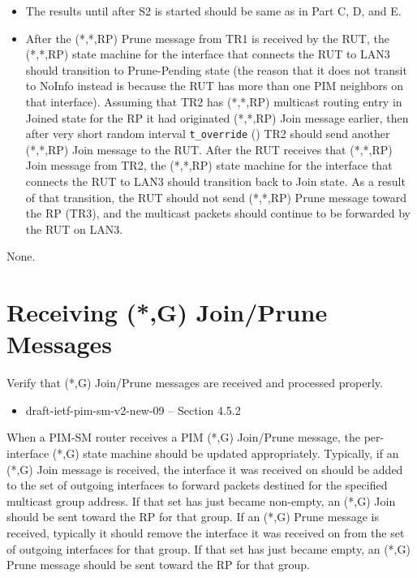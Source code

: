 \documentclass[11pt]{report}
\begin{document}
\begin{itemize}

  \item The results until after S2 is started should be same as in
  Part C, D, and E.

  \item After the (*,*,RP) Prune message from TR1 is received by the RUT,
  the (*,*,RP) state machine for the interface that connects the RUT to
  LAN3 should transition to Prune-Pending state (the reason that it does
  not transit to NoInfo instead is because the RUT has more than one PIM
  neighbors on that interface).
  Assuming that TR2 has (*,*,RP) multicast routing entry in Joined state
  for the RP it had originated (*,*,RP) Join message earlier, then after
  very short random interval \verb=t_override= ({\PimsmTOverride}) TR2
  should send another (*,*,RP) Join message to the RUT.
  After the RUT receives that (*,*,RP) Join message from TR2,
  the (*,*,RP) state machine for the interface that connects the RUT to
  LAN3 should transition back to Join state.
  As a result of that transition, the RUT should not send (*,*,RP) Prune
  message toward the RP (TR3), and the multicast packets should continue
  to be forwarded by the RUT on LAN3.

\end{itemize}

None.

\newpage
\section{Receiving (*,G) Join/Prune Messages}

Verify that (*,G) Join/Prune messages are received and processed
properly.

\begin{itemize}
  \item draft-ietf-pim-sm-v2-new-09 -- Section 4.5.2
\end{itemize}

When a PIM-SM router receives a PIM (*,G) Join/Prune message, the
per-interface (*,G) state machine should be updated appropriately.
Typically, if an (*,G) Join message is received, the interface it was
received on should be added to the set of outgoing interfaces to
forward packets destined for the specified multicast group address.
If that set has just became non-empty, an (*,G) Join should be sent
toward the RP for that group.
If an (*,G) Prune message is received, typically it should remove
the interface it was received on from the set of outgoing interfaces
for that group. If
that set has just became empty, an (*,G) Prune message should be
sent toward the RP for that group.
\end{document}
